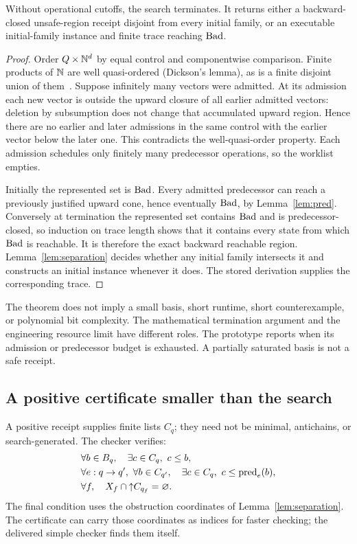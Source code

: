 \begin{theorem}
\label{thm:countercomplete}
Without operational cutoffs, the search terminates. It returns either a
backward-closed unsafe-region receipt disjoint from every initial family, or
an executable initial-family instance and finite trace reaching $\operatorname{Bad}$.
\end{theorem}
\begin{proof}
Order $Q\times\mathbb N^d$ by equal control and componentwise comparison. Finite
products of $\mathbb N$ are well quasi-ordered (Dickson's lemma), as is a finite
disjoint union of them~\cite{abdulla,finkel,wqo}. Suppose infinitely many
vectors were admitted. At its admission each new vector is outside the upward
closure of all earlier admitted vectors: deletion by subsumption does not
change that accumulated upward region. Hence there are no earlier and later
admissions in the same control with the earlier vector below the later one.
This contradicts the well-quasi-order property. Each admission schedules only
finitely many predecessor operations, so the worklist empties.

Initially the represented set is $\operatorname{Bad}$. Every admitted predecessor can reach
a previously justified upward cone, hence eventually $\operatorname{Bad}$, by
Lemma~\ref{lem:pred}. Conversely at termination the represented set contains
$\operatorname{Bad}$ and is predecessor-closed, so induction on trace length shows that it
contains every state from which $\operatorname{Bad}$ is reachable. It is therefore the exact
backward reachable region. Lemma~\ref{lem:separation} decides whether any
initial family intersects it and constructs an initial instance whenever it
does. The stored derivation supplies the corresponding trace.
\end{proof}

The theorem does not imply a small basis, short runtime, short counterexample,
or polynomial bit complexity. The mathematical termination argument and the
engineering resource limit have different roles. The prototype reports
 when its admission or predecessor budget is exhausted. A
partially saturated basis is not a safe receipt.

\subsection{A positive certificate smaller than the search}
A positive receipt supplies finite lists $C_q$; they need not be minimal,
antichains, or search-generated. The checker verifies:
\begin{align}
 &\forall b\in B_q,\quad \exists c\in C_q,\ c\le b,
 \label{eq:badincluded}\\
 &\forall e:q\to q',\ \forall b\in C_{q'},\quad
      \exists c\in C_q,\ c\le\operatorname{pred}_e(b),
 \label{eq:backclosed}\\
 &\forall f,\quad X_f\cap\mathord{\uparrow}C_{q_f}=\varnothing.
 \label{eq:initseparate}
\end{align}
The final condition uses the obstruction coordinates of
Lemma~\ref{lem:separation}. The certificate can carry those coordinates as
indices for faster checking; the delivered simple checker finds them itself.

